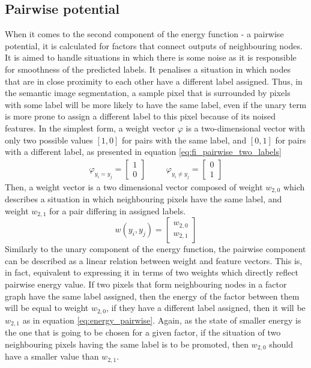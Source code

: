 \subsection{Pairwise potential}

When it comes to the second component of the energy function - a pairwise potential, it is calculated for factors that connect outputs of neighbouring nodes. It is aimed to handle situations in which there is some noise as it is responsible for smoothness of the predicted labels. It penalises a situation in which nodes that are in close proximity to each other have a different label assigned. Thus, in the semantic image segmentation, a sample pixel that is surrounded by pixels with some label will be more likely to have the same label, even if the unary term is more prone to assign a different label to this pixel because of its noised features. In the simplest form, a weight vector $\varphi$ is a two-dimensional vector with only two possible values $[1,0]$ for pairs with the same label, and $[0,1]$ for pairs with a different label, as presented in equation \ref{eq:fi_pairwise_two_labels}
\begin{equation}
    \label{eq:fi_pairwise_two_labels}
    \begin{matrix}
        \varphi_{y_i = y_j} = \begin{bmatrix}
            1 \\
            0
        \end{bmatrix} & & &
        \varphi_{y_i \neq y_j} = \begin{bmatrix}
            0 \\
            1
        \end{bmatrix}
    \end{matrix}
\end{equation}
Then, a weight vector is a two dimensional vector composed of weight $w_{2,0}$ which describes a situation in which neighbouring pixels have the same label, and weight $w_{2,1}$ for a pair differing in assigned labels. 
\begin{equation}
    \label{eq:weight_pairwise}
    w(y_i, y_j) = \begin{bmatrix}
        w_{2,0} \\ 
        w_{2,1}
    \end{bmatrix}
\end{equation}
Similarly to the unary component of the energy function, the pairwise component can be described as a linear relation between weight and feature vectors. This is, in fact,  equivalent to expressing it in terms of two weights which directly reflect pairwise energy value. If two pixels that form neighbouring nodes in a factor graph have the same label assigned, then the energy of the factor between them will be equal to weight $w_{2,0}$, if they have a different label assigned, then it will be $w_{2,1}$ as in equation \ref{eq:energy_pairwise}. Again, as the state of smaller energy is the one that is going to be chosen for a given factor, if the situation of two neighbouring pixels having the same label is to be promoted, then $w_{2,0}$ should have a smaller value than $w_{2,1}$.
